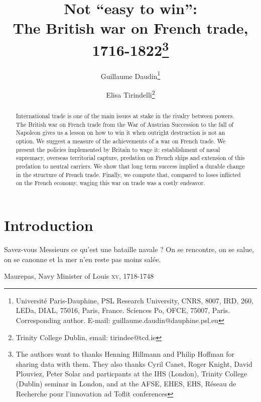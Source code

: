 \documentclass[12pt,a4paper,notitlepage,english]{article}
\author{
  Guillaume Daudin\thanks{Université Paris-Dauphine, PSL Research University, CNRS, 8007, IRD, 260, LEDa, DIAL, 75016, Paris, France. Sciences Po, OFCE, 75007, Paris. Corresponding author. E-mail: guillaume.daudin@dauphine.psl.eu}
  \and
  Elisa Tirindelli\thanks{Trinity College Dublin, email: tirindee@tcd.ie}
}
\title{Not “easy to win”: \\ The British war on French trade, 1716-1822\thanks{The authors want to thanks Henning Hillmann and Philip Hoffman for sharing data with them. They also thanks Cyril Canet, Roger Knight, David Plouviez, Peter Solar and particpants at the IHS (London), Trinity College (Dublin) seminar in London, and at the AFSE, EHES, EHS, Réseau de Recherche pour l’innovation ad Toflit conferences}}
\date{}
\begin{document}
\maketitle


\begin{abstract}
International trade is one of the main issues at stake in the rivalry between powers.
The British war on French trade from the War of Austrian Succession to the fall of Napoleon gives us a lesson on how to win it when outright destruction is not an option.
We suggest a measure of the achievements of a war on French trade.
We present the policies implemented by Britain to wage it: establishment of naval supremacy, overseas territorial capture, predation on French ships and extension of this predation to neutral carriers.
We show that long term success implied a durable change in the structure of French trade.
Finally, we compute that, compared to loses inflicted on the French economy, waging this war on trade was a costly endeavor.
\end{abstract}


\section{Introduction} \label{introduction}

\epigraph{Savez-vous Messieurs ce qu’est une bataille navale ? On se rencontre, on se salue, on se canonne et la mer n’en reste pas moins salée.}{Maurepas, Navy Minister of Louis  \textsc{xv}, 1718-1748}

\maketitle
\end{document}
